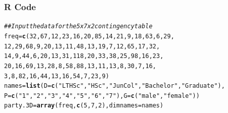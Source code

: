 \documentclass[oneside]{book}\usepackage[]{graphicx}\usepackage[svgnames]{xcolor}
\makeatletter
\newcommand{\hlnum}[1]{\textcolor[rgb]{0.686,0.059,0.569}{#1}}%
\newcommand{\hlstr}[1]{\textcolor[rgb]{0.192,0.494,0.8}{#1}}%
\newcommand{\hlcom}[1]{\textcolor[rgb]{0.678,0.584,0.686}{\textit{#1}}}%
\newcommand{\hlstd}[1]{\textcolor[rgb]{0.345,0.345,0.345}{#1}}%
\newcommand{\hlkwb}[1]{\textcolor[rgb]{0.69,0.353,0.396}{#1}}%
\newcommand{\hlkwc}[1]{\textcolor[rgb]{0.333,0.667,0.333}{#1}}%
\newcommand{\hlkwd}[1]{\textcolor[rgb]{0.737,0.353,0.396}{\textbf{#1}}}%
\newenvironment{kframe}{%
 \def\at@end@of@kframe{}%
 \ifinner\ifhmode%
  \def\at@end@of@kframe{\end{minipage}}%
  \begin{minipage}{\columnwidth}%
 \fi\fi%
 \def\FrameCommand##1{\hskip\@totalleftmargin \hskip-\fboxsep
 \colorbox{shadecolor}{##1}\hskip-\fboxsep
     \hskip-\linewidth \hskip-\@totalleftmargin \hskip\columnwidth}%
 \MakeFramed {\advance\hsize-\width
   \@totalleftmargin\z@ \linewidth\hsize
   \@setminipage}}%
 {\par\unskip\endMakeFramed%
 \at@end@of@kframe}
\newenvironment{knitrout}{}{} %
\makeatother
\begin{document}
\subsubsection*{R Code}
\begin{knitrout}
\color{fgcolor}\begin{kframe}
\begin{alltt}
\hlcom{## Input the data for the 5 x 7 x 2 contingency table}
\hlstd{freq} \hlkwb{=} \hlkwd{c}\hlstd{(}\hlnum{32}\hlstd{,} \hlnum{67}\hlstd{,} \hlnum{12}\hlstd{,} \hlnum{23}\hlstd{,} \hlnum{16}\hlstd{,} \hlnum{20}\hlstd{,} \hlnum{85}\hlstd{,} \hlnum{14}\hlstd{,} \hlnum{21}\hlstd{,} \hlnum{9}\hlstd{,} \hlnum{18}\hlstd{,} \hlnum{63}\hlstd{,} \hlnum{6}\hlstd{,} \hlnum{29}\hlstd{,}
  \hlnum{12}\hlstd{,} \hlnum{29}\hlstd{,} \hlnum{68}\hlstd{,} \hlnum{9}\hlstd{,} \hlnum{20}\hlstd{,} \hlnum{13}\hlstd{,} \hlnum{11}\hlstd{,} \hlnum{48}\hlstd{,} \hlnum{13}\hlstd{,} \hlnum{19}\hlstd{,} \hlnum{7}\hlstd{,} \hlnum{12}\hlstd{,} \hlnum{65}\hlstd{,} \hlnum{17}\hlstd{,} \hlnum{32}\hlstd{,}
  \hlnum{14}\hlstd{,} \hlnum{9}\hlstd{,} \hlnum{44}\hlstd{,} \hlnum{6}\hlstd{,} \hlnum{20}\hlstd{,} \hlnum{13}\hlstd{,} \hlnum{31}\hlstd{,} \hlnum{118}\hlstd{,} \hlnum{20}\hlstd{,} \hlnum{33}\hlstd{,} \hlnum{38}\hlstd{,} \hlnum{25}\hlstd{,} \hlnum{98}\hlstd{,} \hlnum{16}\hlstd{,} \hlnum{23}\hlstd{,}
  \hlnum{20}\hlstd{,} \hlnum{16}\hlstd{,} \hlnum{69}\hlstd{,} \hlnum{13}\hlstd{,} \hlnum{28}\hlstd{,} \hlnum{8}\hlstd{,} \hlnum{58}\hlstd{,} \hlnum{88}\hlstd{,} \hlnum{13}\hlstd{,} \hlnum{11}\hlstd{,} \hlnum{13}\hlstd{,} \hlnum{8}\hlstd{,} \hlnum{30}\hlstd{,} \hlnum{7}\hlstd{,} \hlnum{16}\hlstd{,}
  \hlnum{3}\hlstd{,} \hlnum{8}\hlstd{,} \hlnum{82}\hlstd{,} \hlnum{16}\hlstd{,} \hlnum{44}\hlstd{,} \hlnum{13}\hlstd{,} \hlnum{16}\hlstd{,} \hlnum{54}\hlstd{,} \hlnum{7}\hlstd{,} \hlnum{23}\hlstd{,} \hlnum{9}\hlstd{)}
\hlstd{names} \hlkwb{=} \hlkwd{list}\hlstd{(}\hlkwc{D} \hlstd{=} \hlkwd{c}\hlstd{(}\hlstr{"LT HSc"}\hlstd{,} \hlstr{"HSc"}\hlstd{,} \hlstr{"JunCol"}\hlstd{,} \hlstr{"Bachelor"}\hlstd{,} \hlstr{"Graduate"}\hlstd{),}
  \hlkwc{P} \hlstd{=} \hlkwd{c}\hlstd{(}\hlstr{"1"}\hlstd{,} \hlstr{"2"}\hlstd{,} \hlstr{"3"}\hlstd{,} \hlstr{"4"}\hlstd{,} \hlstr{"5"}\hlstd{,} \hlstr{"6"}\hlstd{,} \hlstr{"7"}\hlstd{),} \hlkwc{G} \hlstd{=} \hlkwd{c}\hlstd{(}\hlstr{"male"}\hlstd{,} \hlstr{"female"}\hlstd{))}
\hlstd{party.3D} \hlkwb{=} \hlkwd{array}\hlstd{(freq,} \hlkwd{c}\hlstd{(}\hlnum{5}\hlstd{,} \hlnum{7}\hlstd{,} \hlnum{2}\hlstd{),} \hlkwc{dimnames} \hlstd{= names)}

\end{alltt}
\end{kframe}
\end{knitrout}
\end{document}
